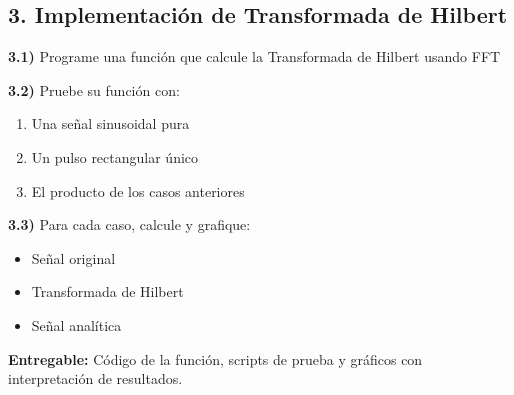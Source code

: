 \subsection*{3. Implementación de Transformada de Hilbert}

\textbf{3.1)} Programe una función que calcule la Transformada de Hilbert usando FFT

\textbf{3.2)} Pruebe su función con:
\begin{enumerate}[label=\alph*)]
    \item Una señal sinusoidal pura
    \item Un pulso rectangular único
    \item El producto de los casos anteriores
\end{enumerate}

\textbf{3.3)} Para cada caso, calcule y grafique:
\begin{itemize}
    \item Señal original
    \item Transformada de Hilbert
    \item Señal analítica
\end{itemize}

\textbf{Entregable:} Código de la función, scripts de prueba y gráficos con interpretación de resultados.